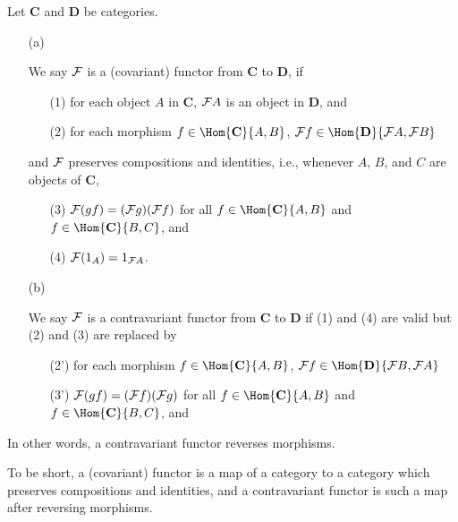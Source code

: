 \begin{defi}
    Let $\textbf{C}$ and $\textbf{D}$ be categories.
    \begin{enumerate}
        \item[(a)]
        {
            We say ${\mathcal{F}}$ is a (covariant) functor from $\textbf{C}$ to $\textbf{D}$, if
            \begin{enumerate}
                \item[(1)]
                {
                    for each object $A$ in $\textbf{C}$, ${\mathcal{F}}A$ is an object in $\textbf{D}$, and
                }
                \item[(2)]
                {
                    for each morphism $f\in\Hom{\textbf{C}}{A, B}$, $\mc{F}f\in\Hom{\textbf{D}}{\mc{F}A, \mc{F}B}$
                }
            \end{enumerate}
            and ${\mathcal{F}}$ preserves compositions and identities, i.e., whenever $A,\, B$, and $C$ are objects of $\textbf{C}$,
            \begin{enumerate}
                \item[(3)]
                {
                    ${\mathcal{F}}(gf)=({\mathcal{F}}g)({\mathcal{F}}f)$ for all $f\in\Hom{\textbf{C}}{A, B}$ and $f\in\Hom{\textbf{C}}{B, C}$, and
                }
                \item[(4)]
                {
                    ${\mathcal{F}}(1_A)=1_{{\mathcal{F}}A}$.
                }
            \end{enumerate}
        }
        \item[(b)]
        {
            We say ${\mathcal{F}}$ is a contravariant functor from $\textbf{C}$ to $\textbf{D}$ if (1) and (4) are valid but (2) and (3) are replaced by
            \begin{enumerate}
                \item[(2')]
                {
                    for each morphism $f\in\Hom{\textbf{C}}{A, B}$, $\mc{F}f\in\Hom{\textbf{D}}{\mc{F}B, \mc{F}A}$
                }
                \item[(3')]
                {
                    ${\mathcal{F}}(gf)=({\mathcal{F}}f)({\mathcal{F}}g)$ for all $f\in\Hom{\textbf{C}}{A, B}$ and $f\in\Hom{\textbf{C}}{B, C}$, and
                }
            \end{enumerate}
        }
    \end{enumerate}
    In other words, a contravariant functor reverses morphisms.
\end{defi}
To be short, a (covariant) functor is a map of a category to a category which preserves compositions and identities, and a contravariant functor is such a map after reversing morphisms.


